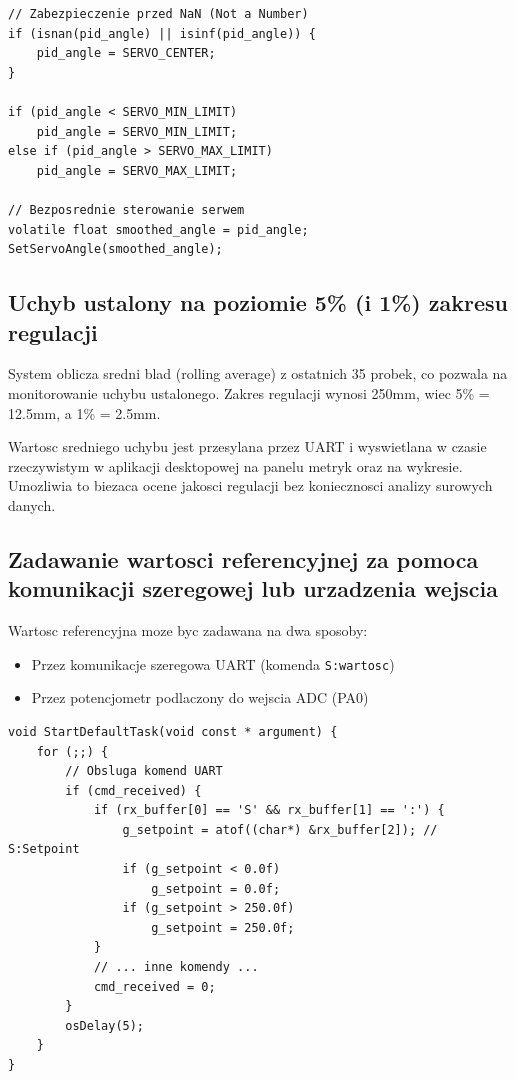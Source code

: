 \documentclass[11pt]{article}
\begin{document}
\begin{lstlisting}[caption={Saturacja wyjscia PID (main.c)}, style=cstyle]
// Zabezpieczenie przed NaN (Not a Number)
if (isnan(pid_angle) || isinf(pid_angle)) {
    pid_angle = SERVO_CENTER;
}

if (pid_angle < SERVO_MIN_LIMIT)
    pid_angle = SERVO_MIN_LIMIT;
else if (pid_angle > SERVO_MAX_LIMIT)
    pid_angle = SERVO_MAX_LIMIT;

// Bezposrednie sterowanie serwem
volatile float smoothed_angle = pid_angle;
SetServoAngle(smoothed_angle);
\end{lstlisting}

\subsection{Uchyb ustalony na poziomie 5\% (i 1\%) zakresu regulacji}

System oblicza sredni blad (rolling average) z ostatnich 35 probek, co pozwala na monitorowanie uchybu ustalonego. Zakres regulacji wynosi 250mm, wiec 5\% = 12.5mm, a 1\% = 2.5mm.

Wartosc sredniego uchybu jest przesylana przez UART i wyswietlana w czasie rzeczywistym w aplikacji desktopowej na panelu metryk oraz na wykresie. Umozliwia to biezaca ocene jakosci regulacji bez koniecznosci analizy surowych danych.

\subsection{Zadawanie wartosci referencyjnej za pomoca komunikacji szeregowej lub urzadzenia wejscia}

Wartosc referencyjna moze byc zadawana na dwa sposoby:
\begin{itemize}
    \item Przez komunikacje szeregowa UART (komenda \texttt{S:wartosc})
    \item Przez potencjometr podlaczony do wejscia ADC (PA0)
\end{itemize}

\begin{lstlisting}[caption={Obsluga komendy setpointu przez UART (main.c)}, style=cstyle]
void StartDefaultTask(void const * argument) {
    for (;;) {
        // Obsluga komend UART
        if (cmd_received) {
            if (rx_buffer[0] == 'S' && rx_buffer[1] == ':') {
                g_setpoint = atof((char*) &rx_buffer[2]); // S:Setpoint
                if (g_setpoint < 0.0f)
                    g_setpoint = 0.0f;
                if (g_setpoint > 250.0f)
                    g_setpoint = 250.0f;
            }
            // ... inne komendy ...
            cmd_received = 0;
        }
        osDelay(5);
    }
}
\end{lstlisting}
\end{document}
